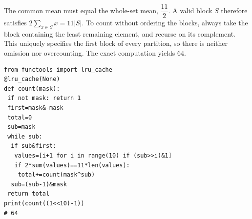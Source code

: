 The common mean must equal the whole-set mean, $\dfrac{11}{2}$. A valid block $S$ therefore satisfies $2\sum_{x\in S}x=11|S|$. To count without ordering the blocks, always take the block containing the least remaining element, and recurse on its complement. This uniquely specifies the first block of every partition, so there is neither omission nor overcounting. The exact computation yields $\boxed{64}$.
\begin{verbatim}
from functools import lru_cache
@lru_cache(None)
def count(mask):
 if not mask: return 1
 first=mask&-mask
 total=0
 sub=mask
 while sub:
  if sub&first:
   values=[i+1 for i in range(10) if (sub>>i)&1]
   if 2*sum(values)==11*len(values):
    total+=count(mask^sub)
  sub=(sub-1)&mask
 return total
print(count((1<<10)-1))
# 64
\end{verbatim}
